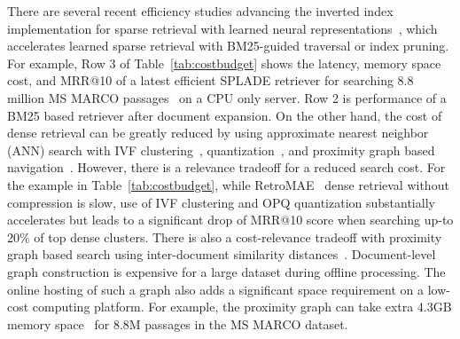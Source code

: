There are several recent efficiency studies advancing the
inverted index implementation for sparse retrieval with learned neural 
representations~\cite{Lassance2022SPLADE-efficient,mallia2022faster,qiao2023optimizing,2023SIGIR-Qiao, 2023SIGIR-SPLADE-pruning},
which accelerates learned sparse retrieval with BM25-guided traversal or index pruning.
For example, Row 3 of Table~\ref{tab:costbudget} shows the latency, memory space cost, and  MRR@10  of
a latest efficient SPLADE retriever for searching 8.8 million 
MS MARCO passages~\cite{2023SIGIR-Qiao} on a CPU only server.
Row 2 is performance of a BM25 based retriever after document expansion. 
On the other hand, 
the cost  of dense retrieval can be greatly reduced  by using  approximate nearest neighbor (ANN) search with 
IVF clustering~\cite{johnson2019billion, 2021Facebook-DrBoost-Lewis}, quantization~\cite{2021CIKM-JPQ-Zhan,  2022WSDM-Zhan-RepCONC, Xiao2022Distill-VQ},
and  proximity graph based navigation~\cite{2020TPAMI-HNSW,2022CIKM-MacAvaneyGraphReRank,2023SIGIR-LADR}. 
However, there is a  relevance tradeoff for a  reduced search cost.
For the example in  Table~\ref{tab:costbudget},  
while RetroMAE~\cite{Liu2022RetroMAE} dense retrieval without compression is slow, use of
IVF clustering and OPQ quantization substantially accelerates but leads to a significant drop  of   MRR@10 score when searching up-to 20\%  
of top dense clusters. 
There is also a cost-relevance tradeoff  with proximity graph based search  using inter-document similarity distances~\cite{2020TPAMI-HNSW, 
2022CIKM-MacAvaneyGraphReRank,2023SIGIR-LADR}.  Document-level  graph  construction is  expensive
for a large dataset during offline processing. The online hosting of such a graph also adds a significant space requirement  on a low-cost
computing platform. For example, the proximity graph  can take extra 4.3GB memory space~\cite{2023SIGIR-LADR}
for 8.8M  passages in the MS MARCO dataset.
